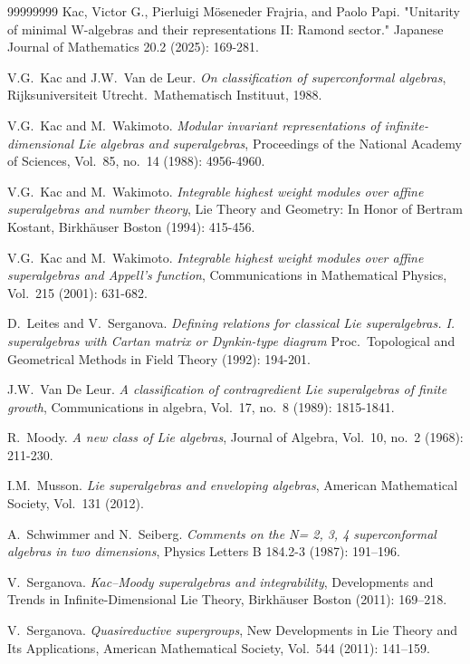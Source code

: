 \documentclass[12pt, a4paper, reqno]{amsart}
\theoremstyle{definition}
\theoremstyle{definition}
\theoremstyle{definition}
\numberwithin{theorem}{section}
\numberwithin{lemma}{section}
\numberwithin{remark}{section}
\numberwithin{definition}{section}
\numberwithin{corollary}{section}
\numberwithin{proposition}{section}
\numberwithin{example}{section}
\begin{document}
\begin{thebibliography}{99999999}
		 Kac, Victor G., Pierluigi Möseneder Frajria, and Paolo Papi. "Unitarity of minimal W-algebras and their representations II: Ramond sector." Japanese Journal of Mathematics 20.2 (2025): 169-281.
		
		 V.G.~Kac and J.W.~Van de Leur. \emph{On classification of superconformal algebras}, Rijksuniversiteit Utrecht.~Mathematisch Instituut, 1988.
		
		 V.G.~Kac and M.~Wakimoto. \emph{Modular invariant representations of infinite-dimensional Lie algebras and superalgebras}, Proceedings of the National Academy of Sciences, Vol.~85, no.~14 (1988): 4956-4960.	
		
		 V.G.~Kac and M.~Wakimoto. \emph{Integrable highest weight modules over affine superalgebras and number theory}, Lie Theory and Geometry: In Honor of Bertram Kostant, Birkhäuser Boston (1994): 415-456.
		
		 V.G.~Kac and M.~Wakimoto. \emph{Integrable highest weight modules over affine superalgebras and Appell's function}, Communications in Mathematical Physics, Vol.~215 (2001): 631-682.
	
		 D.~Leites and V.~Serganova. \emph{Defining relations for classical Lie superalgebras. I. superalgebras with Cartan matrix or Dynkin-type diagram} Proc.~Topological and Geometrical Methods in Field Theory (1992): 194-201.
		
		 J.W.~Van De Leur. \emph{A classification of contragredient Lie superalgebras of finite growth}, Communications in algebra, Vol.~17, no.~8 (1989): 1815-1841.
		
		 R.~Moody.  \emph{A new class of Lie algebras}, Journal of Algebra, Vol.~10, no.~2 (1968): 211-230.
		
		 I.M.~Musson. \textit{Lie superalgebras and enveloping algebras}, American Mathematical Society, Vol.~131 (2012).
		
		 A.~Schwimmer and N.~Seiberg. \emph{Comments on the N= 2, 3, 4 superconformal algebras in two dimensions}, Physics Letters B 184.2-3 (1987): 191--196.
		
		 V.~Serganova. \textit{Kac--Moody superalgebras and integrability}, Developments and Trends in Infinite-Dimensional Lie Theory, Birkhäuser Boston (2011): 169--218.
		
		 V.~Serganova. \textit{Quasireductive supergroups}, New Developments in Lie Theory and Its Applications, American Mathematical Society, Vol.~544 (2011): 141--159. 
		

\end{thebibliography}
\end{document}
